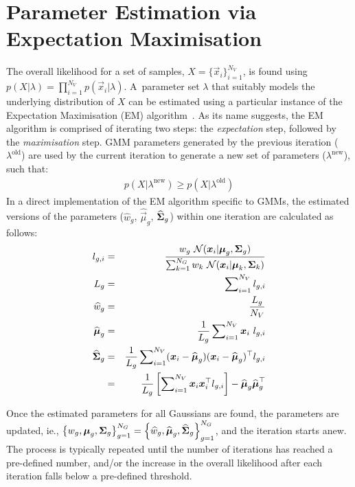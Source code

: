 \section{Parameter Estimation via Expectation Maximisation}
\label{sec:parameter_estimation}

\noindent
The overall likelihood for a set of samples, $X=\{\Vec{x}_i\}_{i=1}^{N_V}$,
is found using $p(X | \lambda) = \prod\nolimits_{i=1}^{N_V} p(\Vec{x}_i | \lambda)$.
A~parameter set $\lambda$ that suitably models the underlying distribution of $X$ can be estimated using a particular instance of the Expectation Maximisation (EM) algorithm~\cite{Dempster77, McLachlan-2008, Moon96, Redner84}.
As its name suggests, the EM algorithm is comprised of iterating two steps: the {\it expectation} step, followed by the {\it maximisation} step.
GMM parameters generated by the previous iteration ($\lambda^{\textrm{old}}$) are used
by the current iteration to generate a new set of parameters ($\lambda^{\textrm{new}}$), such that:
%
\begin{eqnarray}
	p(X|\lambda^{\textrm{new}}) \geq p(X|\lambda^{\textrm{old}})
\end{eqnarray}
%
In a direct implementation of the EM algorithm specific to GMMs,
the estimated versions of the parameters ($\widehat{w}_g$, $\widehat{\Vec{\mu}}_g$, $\widehat{{\boldsymbol{\Sigma}}}_g$)
within one iteration are calculated as follows:
%
\begin{eqnarray}
  l_{g,i}                  & = & \frac{w_g ~ {{\mathcal{N}}}( {\boldsymbol{x}}_i | {\boldsymbol{\mu}}_g, {\boldsymbol{\Sigma}}_g )}{\sum\nolimits_{k=1}^{N_G} w_k ~ {{\mathcal{N}}}( {\boldsymbol{x}}_i | {\boldsymbol{\mu}}_k, {\boldsymbol{\Sigma}}_k )} \label{eqn:aposteriori} \\
  L_g                      & = & \sum\nolimits_{i=1}^{N_V} l_{g,i} \\
  \widehat{w}_g            & = & \frac{L_g}{N_V} \\
  \widehat{{\boldsymbol{\mu}}}_g    & = & \frac{1}{L_g} \sum\nolimits_{i=1}^{N_V} {\boldsymbol{x}}_i ~ l_{g,i}  \\
  \widehat{{\boldsymbol{\Sigma}}}_g & = & \frac{1}{L_g} \sum\nolimits_{i=1}^{N_V} ({\boldsymbol{x}}_i - \widehat{{\boldsymbol{\mu}}}_g)({\boldsymbol{x}}_i - \widehat{{\boldsymbol{\mu}}}_g)^\top l_{g,i} \\
                           & = &  \frac{1}{L_g} \left[ \sum\nolimits_{i=1}^{N_V} {\boldsymbol{x}}_i {\boldsymbol{x}}_i^\top l_{g,i} \right] - \widehat{{\boldsymbol{\mu}}}_g \widehat{{\boldsymbol{\mu}}}_g^\top
\end{eqnarray}

\noindent
Once the estimated parameters for all Gaussians are found, the parameters are updated,
ie., {\small $\left\{ w_g, {\boldsymbol{\mu}}_g, {\boldsymbol{\Sigma}}_g \right\}_{g=1}^{N_G} = \left\{ \widehat{w}_g, \widehat{{\boldsymbol{\mu}}}_g, \widehat{{\boldsymbol{\Sigma}}}_g \right\}_{g=1}^{N_G}$},
and the iteration starts anew.
The process is typically repeated until the number of iterations has reached a pre-defined number,
and/or the increase in the overall likelihood after each iteration falls below a pre-defined threshold.

